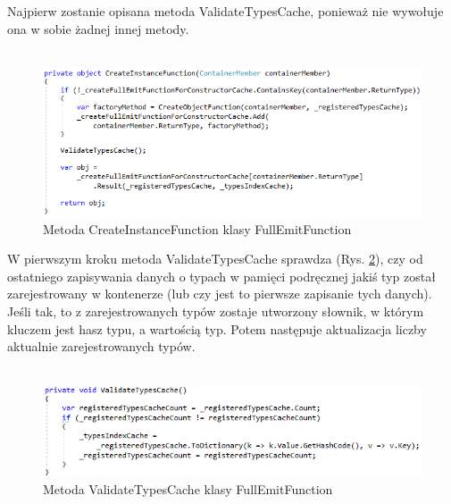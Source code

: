 \documentclass[12pt]{article}
\begin{document}
Najpierw zostanie opisana metoda ValidateTypesCache, ponieważ nie wywołuje ona w sobie żadnej innej metody.\\ \\
\begin{figure}[H]
	\begin{center}
  		\includegraphics{FullEmitFunction_CreateInstanceFunction.png}
  		\caption{Metoda CreateInstanceFunction klasy FullEmitFunction}
  		\label{fig:FullEmitFunction_CreateInstanceFunction}
	\end{center}
\end{figure}

W pierwszym kroku metoda ValidateTypesCache sprawdza (Rys. \ref{fig:FullEmitFunction_ValidateTypesCache}), czy od ostatniego zapisywania danych o typach w pamięci podręcznej jakiś typ został zarejestrowany w kontenerze (lub czy jest to pierwsze zapisanie tych danych). Jeśli tak, to z zarejestrowanych typów zostaje utworzony słownik, w którym kluczem jest hasz typu, a wartością typ. Potem następuje aktualizacja liczby aktualnie zarejestrowanych typów.\\ \\
\begin{figure}[H]
	\begin{center}
  		\includegraphics{FullEmitFunction_ValidateTypesCache.png}
  		\caption{Metoda ValidateTypesCache klasy FullEmitFunction}
  		\label{fig:FullEmitFunction_ValidateTypesCache}
	\end{center}
\end{figure}
\end{document}
